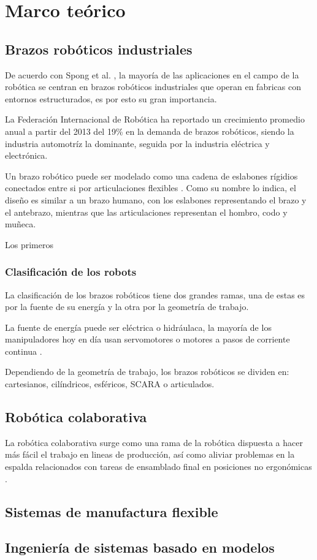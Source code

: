 \chapter{Marco teórico}

\section{Brazos robóticos industriales}

De acuerdo con Spong et al. \cite{Spong2005}, la mayoría de las aplicaciones en el campo de la robótica se centran en brazos robóticos industriales que operan en fabricas con entornos estructurados, es por esto su gran importancia.

La Federación Internacional de Robótica ha reportado un crecimiento promedio anual a partir del 2013 del 19\% en la demanda de brazos robóticos, siendo la industria automotríz la dominante, seguida por la industria eléctrica y electrónica. \cite{summary2019}

Un brazo robótico puede ser modelado como una cadena de eslabones rígidios conectados entre si por articulaciones flexibles \cite{Schilling2001}. Como su nombre lo indica, el diseño es similar a un brazo humano, con los eslabones representando el brazo y el antebrazo, mientras que las articulaciones representan el hombro, codo y muñeca.

Los primeros 

\subsection{Clasificación de los robots}

La clasificación de los brazos robóticos tiene dos grandes ramas, una de estas es por la fuente de su energía y la otra por la geometría de trabajo. 

La fuente de energía puede ser eléctrica o hidráulaca, la mayoría de los manipuladores hoy en día usan servomotores o motores a pasos de corriente continua \cite{Schilling2001}.

Dependiendo de la geometría de trabajo, los brazos robóticos  se dividen en: cartesianos, cilíndricos, esféricos, SCARA o articulados.

\section{Robótica colaborativa}

La robótica colaborativa surge como una rama de la robótica dispuesta a hacer más fácil el trabajo en lineas de producción, así como aliviar problemas en la espalda relacionados con tareas de ensamblado final en posiciones no ergonómicas \cite{cobot2018}\cite{cobotreview}.



\section{Sistemas de manufactura flexible}
\section{Ingeniería de sistemas basado en modelos}
